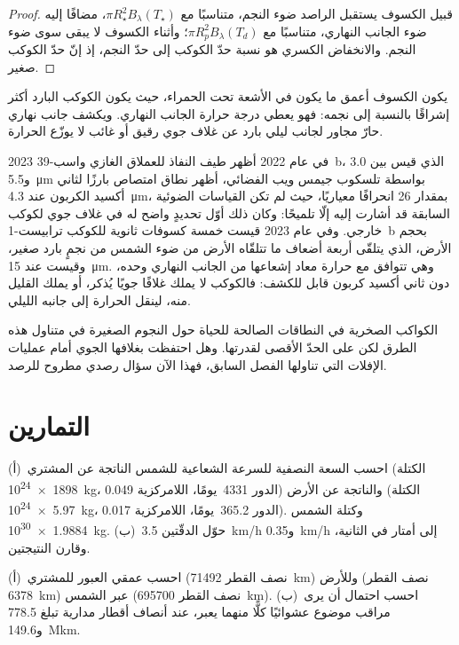 \begin{proof}
قبيل الكسوف يستقبل الراصد ضوء النجم، متناسبًا مع
$\pi R_\star^2 B_\lambda(T_\star)$، مضافًا إليه ضوء الجانب النهاري،
متناسبًا مع $\pi R_p^2 B_\lambda(T_d)$؛ وأثناء الكسوف لا يبقى سوى
ضوء النجم. والانخفاض الكسري هو نسبة حدّ الكوكب إلى حدّ النجم،
إذ إنّ حدّ الكوكب صغير.
\end{proof}

يكون الكسوف أعمق ما يكون في الأشعة تحت الحمراء، حيث يكون الكوكب البارد
أكثر إشراقًا بالنسبة إلى نجمه: فهو يعطي درجة حرارة الجانب النهاري.
ويكشف جانب نهاري حارّ مجاور لجانب ليلي بارد عن غلاف جوي رقيق أو غائب
لا يوزّع الحرارة.

\begin{dated}{2023}
في عام 2022 أظهر طيف النفاذ للعملاق الغازي واسب-39~b، الذي قيس
بين 3.0 و\qty{5.5}{\micro m} بواسطة تلسكوب جيمس ويب الفضائي،
أظهر نطاق امتصاص بارزًا لثاني أكسيد الكربون عند
\qty{4.3}{\micro m}، بمقدار 26 انحرافًا معياريًا، حيث لم تكن القياسات الضوئية السابقة قد أشارت إليه إلّا
تلميحًا: وكان ذلك أوّل تحديدٍ واضح له
في غلاف جوي لكوكب خارجي. وفي عام 2023 قيست خمسة كسوفات ثانوية
للكوكب ترابيست-1~b بحجم الأرض، الذي يتلقّى أربعة أضعاف ما تتلقّاه الأرض من ضوء الشمس
من نجمٍ بارد صغير، وقيست عند \qty{15}{\micro m}. وهي تتوافق
مع حرارة معاد إشعاعها من الجانب النهاري وحده، دون ثاني أكسيد كربون قابل للكشف:
فالكوكب لا يملك غلافًا جويًا يُذكر، أو يملك القليل منه، لينقل الحرارة
إلى جانبه الليلي.
\end{dated}

الكواكب الصخرية في النطاقات الصالحة للحياة حول النجوم الصغيرة في متناول هذه الطرق
لكن على الحدّ الأقصى لقدرتها. وهل احتفظت بغلافها الجوي أمام عمليات
الإفلات التي تناولها الفصل السابق، فهذا الآن سؤال رصدي
مطروح للرصد.

\section{التمارين}

\begin{exercise}[$\star$]\label{exo:b3:exoplanets:1}
(أ)~احسب السعة النصفية للسرعة الشعاعية للشمس الناتجة عن
المشتري (الكتلة \qty{1898e24}{kg}، الدور \num{4331}~يومًا، اللامركزية
0.049) والناتجة عن الأرض (الكتلة \qty{5.97e24}{kg}، الدور \num{365.2}~يومًا،
اللامركزية 0.017). وكتلة الشمس \qty{1.9884e30}{kg}.
(ب)~حوّل الدقّتين \qty{3.5}{km/h} و\qty{0.35}{km/h} إلى
أمتار في الثانية، وقارن النتيجتين.
\end{exercise}

\begin{exercise}[$\star$]\label{exo:b3:exoplanets:2}
(أ)~احسب عمقي العبور للمشتري (نصف القطر \qty{71492}{km})
وللأرض (نصف القطر \qty{6378}{km}) عبر الشمس (نصف القطر
\qty{695700}{km}). (ب)~احسب احتمال أن يرى مراقب موضوع عشوائيًا
كلًّا منهما يعبر، عند أنصاف أقطار مدارية تبلغ \num{778.5}
و\qty{149.6}{\mega km}.
\end{exercise}

